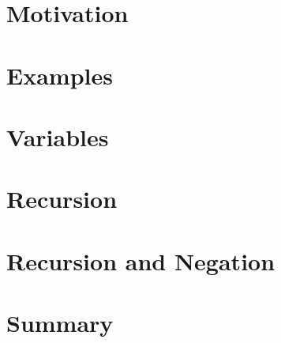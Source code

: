 \newcommand{\myinput}[1]{
\ifx\inlibrary\undefined
  
\else
  
\fi
}

\myinput{ezasp/macros}
\myinput{ezasp/summary}
\section{Motivation}
\myinput{ezasp/motivation}
\section{Examples}
\myinput{ezasp/example1}
\myinput{ezasp/example2}
\section{Variables}
\myinput{ezasp/example3}
\myinput{ezasp/example4}
\section{Recursion}
\myinput{ezasp/example5}
\myinput{ezasp/example6}
\myinput{ezasp/traveling}
\myinput{ezasp/oddeven}
\section{Recursion and Negation}
\myinput{ezasp/negative}
\section{Summary}
%
%
%
%
